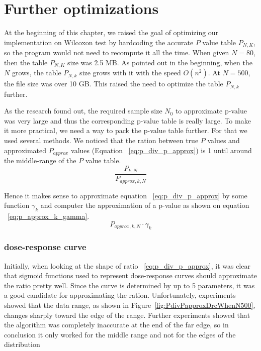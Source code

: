 \documentclass[12pt]{article}
\begin{document}
{\section{Further optimizations}
At the beginning of this chapter, we raised the goal of optimizing our implementation on Wilcoxon test by hardcoding the accurate $P$ value table $P_{N, K}$, so the program would not need to recompute it all the time. When given $N = 80$, then the table $P_{N, K}$ size was 2.5 MB. As pointed out in the beginning, when the $N$ grows, the table $P_{N, k}$ size grows with it with the speed $O(n^2)$. At $N = 500$, the file size was over 10 GB. This raised the need to optimize the table $P_{N, k}$ further.

As the research found out, the required sample size $N_0$ to approximate p-value was very large and thus the corresponding p-value table is really large. To make it more practical, we need a way to pack the p-value table further. For that we used several methods. We noticed that the ration between true $P$ values and approximated $P_{approx}$ values (Equation ~\eqref{eq:p_div_p_approx}) is 1 until around the middle-range of the $P$ value table.
\begin{equation}\label{eq:p_div_p_approx}
  \frac{P_{k, N}}{P_{approx, k, N}}
\end{equation}

Hence it makes sense to approximate equation ~\eqref{eq:p_div_p_approx} by some function $\gamma_k$ and computer the approximation of a p-value as shown on equation ~\eqref{eq:p_approx_k_gamma}.
\begin{equation}\label{eq:p_approx_k_gamma}
  P_{approx, k, N} \cdot \gamma_k
\end{equation}


\subsubsection{dose-response curve}
Initially, when looking at the shape of ratio ~\eqref{eq:p_div_p_approx}, it was clear that sigmoid functions used to represent dose-response curves should approximate the ratio pretty well. Since the curve is determined by up to 5 parameters, it was a good candidate for approximating the ration. Unfortunately, experiments showed that the data range, as shown in Figure~\ref{fig:PdivPapproxDrcWhenN500}, changes sharply toward the edge of the range. Further experiments showed that the algorithm was completely inaccurate at the end of the far edge, so in conclusion it only worked for the middle range and not for the edges of the distribution

}
\end{document}
